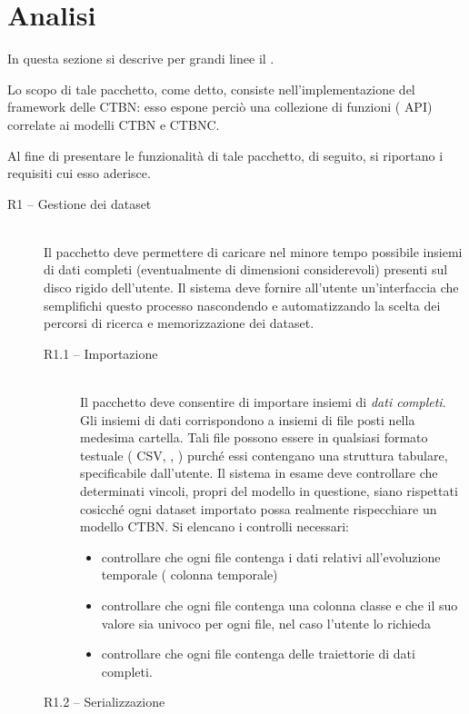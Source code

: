 \section{Analisi}\label{sec:rctbn-describ}
In questa sezione si descrive per grandi linee il \pacchettor{}.

Lo scopo di tale pacchetto, come detto, consiste nell'implementazione del framework delle \acs{CTBN}: esso espone perciò una collezione di funzioni (\ie{} \acs{API}) correlate ai modelli \acs{CTBN} e \acs{CTBNC}.

Al fine di presentare le funzionalità di tale pacchetto, di seguito, si riportano i requisiti cui esso aderisce.
\begin{description}
	\item[R1 -- Gestione dei dataset] \hfill \\
	Il pacchetto deve permettere di caricare nel minore tempo possibile insiemi di dati completi (eventualmente di dimensioni considerevoli) presenti sul disco rigido dell'utente. Il sistema deve fornire all'utente un'interfaccia che semplifichi questo processo nascondendo e automatizzando la scelta dei percorsi di ricerca e memorizzazione dei dataset.
		\begin{description}
		\item[R1.1 -- Importazione] \hfill \\
		Il pacchetto deve consentire di importare insiemi di \emph{dati completi}. Gli insiemi di dati corrispondono a insiemi di file posti nella medesima cartella. Tali file possono essere in qualsiasi formato testuale (\eg{} \acs{CSV}, , ) purché essi contengano una struttura tabulare, specificabile dall'utente. Il sistema in esame deve controllare che determinati vincoli, propri del modello in questione, siano rispettati cosicché ogni dataset importato possa realmente rispecchiare un modello \acs{CTBN}. Si elencano i controlli necessari:
		\begin{itemize}
			\item controllare che ogni file contenga i dati relativi all'evoluzione temporale (\ie{} colonna temporale)
			\item controllare che ogni file contenga una colonna classe e che il suo valore sia univoco per ogni file, nel caso l'utente lo richieda
			\item controllare che ogni file contenga delle traiettorie di dati completi.
		\end{itemize}
		\item[R1.2 -- Serializzazione] \hfill \\

\end{description}
\end{description}
